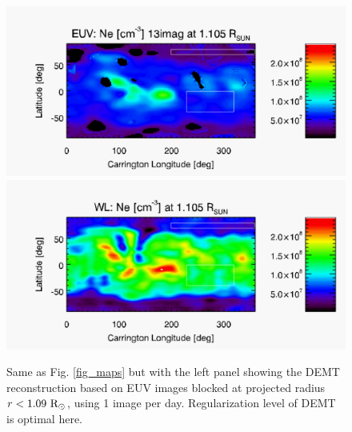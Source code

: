 \documentclass[baaa]{baaa}
\begin{document}
\clearpage

\begin{figure}[]
  \centering
  \includegraphics[width=\columnwidth]{map_Ne_CR2198_DEMT-AIA_H1-L07-09-09_r3D_reduced_1105_Rsun.pdf}
  \includegraphics[width=\columnwidth]{map_ne_kcor.pdf}
  \caption{Same as Fig. \ref{fig_maps} but with the left panel showing the DEMT reconstruction based on EUV images blocked at projected radius $r<1.09~\rm{R}_\odot$, using 1 image per day. Regularization level of DEMT is optimal here.}
  \label{fig_maps5}
\end{figure}
\end{document}

